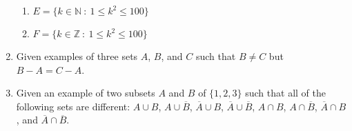 \documentclass[12pt]{article}
\newcommand{\NN}{{\mathbb N}}  %
\newcommand{\ZZ}{{\mathbb Z}}  %
\newcommand{\sep}{{\ :\ }}     %
\begin{document}
\begin{enumerate}
\begin{enumerate}
  \item $E=\{k\in\NN \sep  1\leq k^2\leq 100\}$

  \item $F=\{k\in\ZZ \sep  1\leq k^2\leq 100\}$

  \end{enumerate}

\item Given examples of three sets $A$, $B$, and $C$ such that $B\neq C$ but $B-A=C-A$.

\item Given an example of two subsets $A$ and $B$ of $\{1,2,3\}$ such that all of the following sets are different:
  $A\cup B$, $A\cup\overline{B}$, $\overline{A}\cup B$,     $\overline{A}\cup\overline{B}$,
  $A\cap B$, $A\cap\overline{B}$, $\overline{A}\cap B$, and $\overline{A}\cap\overline{B}$.

\end{enumerate}  
\end{document}
